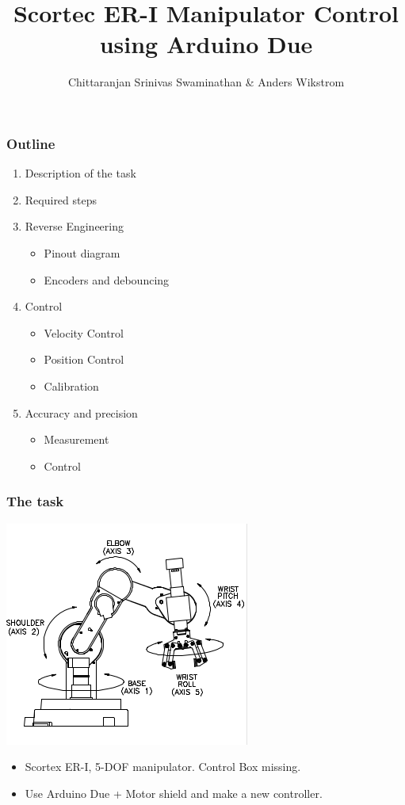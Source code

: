 \documentclass{beamer}
\title[Sensors Assignment 3]
{Scortec ER-I Manipulator Control using Arduino Due}
\author
{Chittaranjan Srinivas Swaminathan \& Anders Wikstrom}
\institute{Orebro University}
\begin{document}
\frame{\titlepage}
  \begin{frame}
    \frametitle{Outline}
    \begin{enumerate}
      \item Description of the task
      \item Required steps
      \item Reverse Engineering
        \begin{itemize}
          \item Pinout diagram
          \item Encoders and debouncing
        \end{itemize}
      \item Control
        \begin{itemize}
          \item Velocity Control
          \item Position Control
          \item Calibration
        \end{itemize}
      \item Accuracy and precision
        \begin{itemize}
          \item Measurement 
          \item Control
        \end{itemize}
    \end{enumerate}

  \end{frame}
  \begin{frame}
    \frametitle{The task}
    \centering
    \includegraphics[scale=0.75]{../Report/axes.png}
    \begin{itemize}
      \item<1-> Scortex ER-I, 5-DOF manipulator. Control Box missing.
      \item<2-> Use Arduino Due + Motor shield and make a new controller.
    \end{itemize}
  \end{frame}

  \begin{frame}
  \end{frame}
\end{document}

